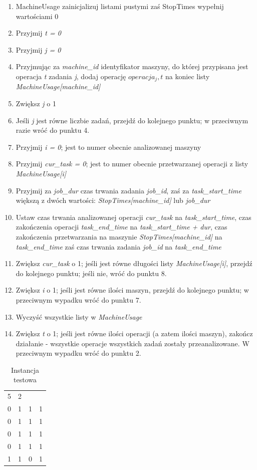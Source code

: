 \documentclass[a4paper,11pt]{article}
\begin{document}
\begin{enumerate}
\item MachineUsage zainicjalizuj listami pustymi zaś StopTimes wypełnij wartościami 0
\item Przyjmij \emph{t = 0}
\item Przyjmij \emph{j = 0}
\item Przyjmując za \emph{machine\_id} identyfikator maszyny, do której przypisana jest operacja \emph{t} zadania \emph{j}, dodaj operację \emph{$operacja_j,t$} na koniec listy \emph{MachineUsage[machine\_id]}
\item Zwiększ \emph{j} o 1
\item Jeśli \emph{j} jest równe liczbie zadań, przejdź do kolejnego punktu; w przeciwnym razie wróć do punktu 4.
\item Przyjmij \emph{i = 0}; jest to numer obecnie analizowanej maszyny
\item Przyjmij \emph{cur\_task = 0}; jest to numer obecnie przetwarzanej operacji z listy \emph{MachineUsage[i]}
\item Przyjmij za \emph{job\_dur} czas trwania zadania \emph{job\_id}, zaś za \emph{task\_start\_time} większą z dwóch wartości: \emph{StopTimes[machine\_id]} lub \emph{job\_dur}
\item Ustaw czas trwania analizowanej operacji \emph{cur\_task} na \emph{task\_start\_time}, czas zakończenia operacji \emph{task\_end\_time} na \emph{task\_start\_time + dur}, czas zakończenia przetwarzania na maszynie \emph{StopTimes[machine\_id]} na \emph{task\_end\_time} zaś czas trwania zadania \emph{job\_id} na \emph{task\_end\_time}
\item Zwiększ \emph{cur\_task} o 1; jeśli jest równe długości listy \emph{MachineUsage[i]}, przejdź do kolejnego punktu; jeśli nie, wróć do punktu 8.
\item Zwiększ \emph{i} o 1; jeśli jest równe ilości maszyn, przejdź do kolejnego punktu; w przeciwnym wypadku wróć do punktu 7.
\item Wyczyść wszystkie listy w \emph{MachineUsage}
\item Zwiększ \emph{t} o 1; jeśli jest równe ilości operacji (a zatem ilości maszyn), zakończ działanie - wszystkie operacje wszystkich zadań zostały przeanalizowane. W przeciwnym wypadku wróć do punktu 2.
\end{enumerate}

\pagebreak

\begin{table}
\begin{center}
\begin{tabular}{ l l l l }
5 & 2 & & \\
0 & 1 & 1 & 1 \\
0 & 1 & 1 & 1 \\
0 & 1 & 1 & 1 \\
0 & 1 & 1 & 1 \\
1 & 1 & 0 & 1 \\
\end{tabular}
\caption{Instancja testowa}
\end{center}
\end{table}
\end{document}
